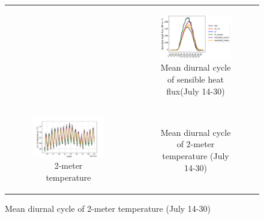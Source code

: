 \begin{figure}[hbtp]
\begin{tabular}{cc}
\begin{subfigure}[t]{0.5\textwidth}
        \end{subfigure} &
        \begin{subfigure}[t]{0.5\textwidth}
            \caption{Mean diurnal cycle of sensible heat flux(July 14-30)}
            \includegraphics[width=\textwidth]{images/chap5/SOP_TS_DC/diurnal_cycle_elsplans_sens.png}
        \end{subfigure} \\
        \begin{subfigure}[t]{0.5\textwidth}
            \caption{2-meter temperature }
            \includegraphics[width=\textwidth]{images/chap5/SOP_TS_DC/time_series_elsplans_t2m.png}
        \end{subfigure} &
        \begin{subfigure}[t]{0.5\textwidth}
            \caption{Mean diurnal cycle of 2-meter temperature (July 14-30)}

\end{subfigure}
\end{tabular}
\end{figure}
